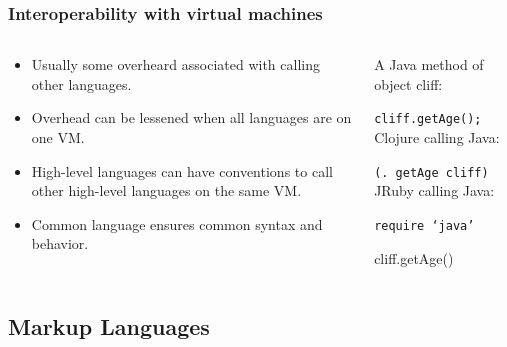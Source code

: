 \documentclass{beamer}
\newcommand{\linespace}{\vskip 0.25cm}
\begin{document}
\begin{frame}
 \frametitle{Interoperability with virtual machines}
 \begin{columns}
 \begin{column}{0.5\textwidth}
 \begin{itemize}
 \item Usually some overheard associated with calling other languages.
 \item Overhead can be lessened when all languages are on one VM.
 \item High-level languages can have conventions to call other high-level languages on the same VM.
 \item Common language ensures common syntax and behavior.
 \end{itemize}
 \end{column}
 
 \begin{column}{0.5\textwidth}
 
 A Java method of object cliff:

 {\tt cliff.getAge();}
 \linespace
 \linespace
 \linespace
 Clojure calling Java:
 
 {\tt (. getAge cliff)}
 \linespace
 \linespace
 JRuby calling Java:
 
 {\tt require `java'
 
 cliff.getAge()}
 \end{column}
 \end{columns}
\end{frame}
\subsection{Markup Languages}
\end{document}
